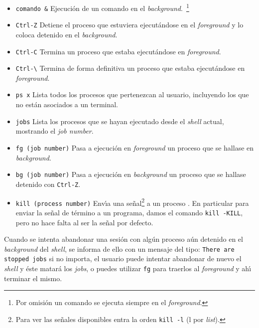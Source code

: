 \begin{itemize}

\item \verb+comando &+ Ejecuci{\'o}n de un comando en el
  {\it background}.\ \footnote{Por omisi{\'o}n un comando se ejecuta siempre
    en el {\it foreground}.}
  
\item \verb+Ctrl-Z+ Detiene el proceso que estuviera ejecut{\'a}ndose en
  el {\it foreground} y lo coloca detenido en el {\it background}.
  
\item \verb+Ctrl-C+ Termina un proceso que estaba ejecut{\'a}ndose en {\it
    foreground}.
  
\item \verb+Ctrl-\+ Termina de forma definitiva un proceso que
  estaba ejecut{\'a}ndose en {\it foreground}.
  
\item \verb+ps x+ Lista todos los procesos que pertenezcan al usuario,
  incluyendo los que no est{\'a}n asociados a un terminal.
  
\item \verb+jobs+  Lista los procesos que se hayan ejecutado desde el
  {\it shell} actual, mostrando el {\it job number}.
  
\item \verb+fg (job number)+ Pasa a ejecuci{\'o}n en {\it foreground}
  un proceso que se hallase en {\it background}.
  
\item \verb+bg (job number)+ Pasa a ejecuci{\'o}n en {\it background} un
  proceso que se hallase detenido con \verb+Ctrl-Z+.
  
\item \verb+kill (process number)+ Env{\'\i}a una se{\~n}al\footnote{Para ver
    las se{\~n}ales disponibles entra la orden {\tt kill -l} (l por {\it
      list}).} a un proceso {\unix}.  En particular para  enviar la
  se{\~n}al de t{\'e}rmino a un programa, damos el comando \verb+kill -KILL+, 
pero no hace falta al ser la se{\~n}al por defecto.
\end{itemize}


Cuando se intenta abandonar una sesi{\'o}n con alg{\'u}n proceso a{\'u}n detenido
en el {\it background} del {\it shell}, se informa de ello con un mensaje del
tipo: \verb+There are stopped jobs+ si no importa, el usuario puede intentar
abandonar de nuevo el {\it shell} y \'este matar{\'a} los {\it jobs}, o puedes utilizar
\verb+fg+ para traerlos al {\it foreground} y ah{\'\i} terminar el mismo.

